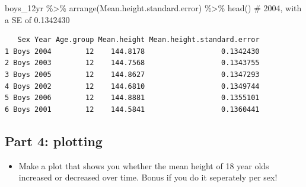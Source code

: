 \documentclass[
  letterpaper,
  DIV=11,
  numbers=noendperiod]{scrreprt}
\newenvironment{Shaded}{}{}
\newcommand{\CommentTok}[1]{\textcolor[rgb]{0.42,0.45,0.49}{#1}}
\newcommand{\FunctionTok}[1]{\textcolor[rgb]{0.44,0.26,0.76}{#1}}
\newcommand{\NormalTok}[1]{\textcolor[rgb]{0.14,0.16,0.18}{#1}}
\newcommand{\SpecialCharTok}[1]{\textcolor[rgb]{0.00,0.36,0.77}{#1}}
\providecommand{\tightlist}{%
  \setlength{\itemsep}{0pt}\setlength{\parskip}{0pt}}\usepackage{longtable,booktabs,array}
\begin{document}
\begin{tcolorbox}
\begin{Shaded}
\begin{Highlighting}[]
\NormalTok{boys\_12yr }\SpecialCharTok{\%\textgreater{}\%} \FunctionTok{arrange}\NormalTok{(Mean.height.standard.error) }\SpecialCharTok{\%\textgreater{}\%} \FunctionTok{head}\NormalTok{() }\CommentTok{\# 2004, with a SE of 0.1342430}
\end{Highlighting}
\end{Shaded}

\begin{verbatim}
   Sex Year Age.group Mean.height Mean.height.standard.error
1 Boys 2004        12    144.8178                  0.1342430
2 Boys 2003        12    144.7568                  0.1343755
3 Boys 2005        12    144.8627                  0.1347293
4 Boys 2002        12    144.6810                  0.1349744
5 Boys 2006        12    144.8881                  0.1355101
6 Boys 2001        12    144.5841                  0.1360441
\end{verbatim}

\end{tcolorbox}

\subsection{Part 4: plotting}\label{part-4-plotting}

\begin{itemize}
\tightlist
\item
  Make a plot that shows you whether the mean height of 18 year olds
  increased or decreased over time. Bonus if you do it seperately per
  sex!
\end{itemize}
\end{document}
